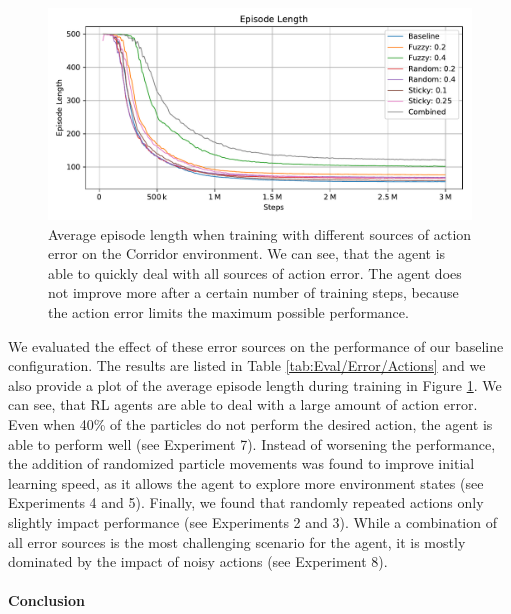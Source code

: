 \begin{figure}[htp]
    \begin{center}
        \includegraphics[clip, width=0.9\columnwidth]{figures/evaluation/error/action_error_ep_len.pdf}
    \end{center}
    \caption[Episode Length During Training with Action Error]{Average episode length when training with different sources of action error on the Corridor environment. We can see, that the agent is able to quickly deal with all sources of action error. The agent does not improve more after a certain number of training steps, because the action error limits the maximum possible performance.} \label{fig:Eval/Error/ActionsTrain}
\end{figure}

We evaluated the effect of these error sources on the performance of our baseline configuration. The results are listed in Table \ref{tab:Eval/Error/Actions} and we also provide a plot of the average episode length during training in Figure \ref{fig:Eval/Error/ActionsTrain}. We can see, that RL agents are able to deal with a large amount of action error. Even when 40\% of the particles do not perform the desired action, the agent is able to perform well (see Experiment 7). Instead of worsening the performance, the addition of randomized particle movements was found to improve initial learning speed, as it allows the agent to explore more environment states (see Experiments 4 and 5). Finally, we found that randomly repeated actions only slightly impact performance (see Experiments 2 and 3). While a combination of all error sources is the most challenging scenario for the agent, it is mostly dominated by the impact of noisy actions (see Experiment 8).  

\paragraph{Conclusion}



